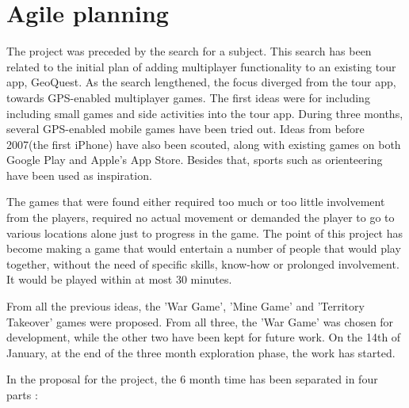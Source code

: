 \section{Agile planning}

The project was preceded by the search for a subject. This search has been
related to the initial plan of adding multiplayer functionality to an existing
tour app, GeoQuest. As the search lengthened, the focus diverged from the
tour app, towards GPS-enabled multiplayer games. The first ideas were for
including including small games and side activities into the tour app.
During three months, several GPS-enabled mobile games have been tried out.
Ideas from before 2007(the first iPhone) have also been scouted, along with
existing games on both Google Play and Apple's App Store. Besides that, sports
such as orienteering have been used as inspiration.\newline

The games that were found either required too much or too little involvement
from the players, required no actual movement or demanded the player to go to various
locations alone just to progress in the game. The point of this project has
become making a game that would entertain a number of people that would play
together, without the need of specific skills, know-how or prolonged
involvement. It would be played within at most 30 minutes.\newline

From all the previous ideas, the 'War Game', 'Mine Game' and 'Territory
Takeover' games were proposed. From all three, the 'War Game' was chosen for
development, while the other two have been kept for future work. On the 14th of
January, at the end of the three month exploration phase, the work has
started.\newline

In the proposal for the project, the 6 month time has been separated in four
parts :

